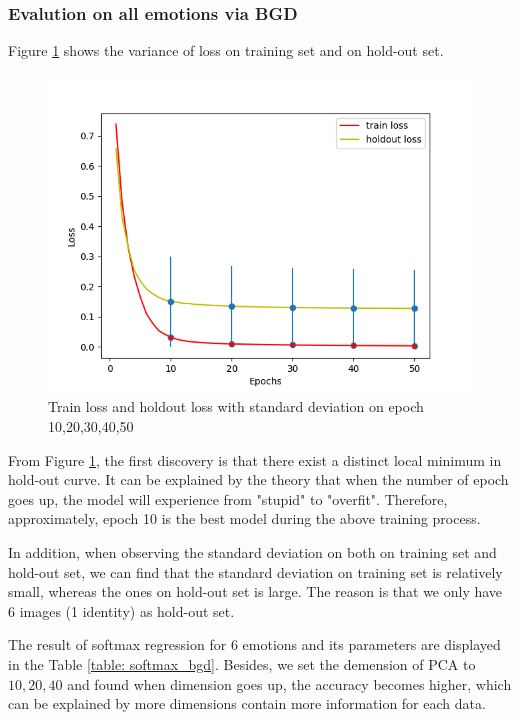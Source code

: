 \documentclass{article}
\begin{document}
\subsubsection{Evalution on all emotions via BGD}
Figure \ref{figure: loss_bgd} shows the variance of loss on training set and on hold-out set.
\begin{figure}[ht]
\begin{center}
\includegraphics[scale=0.5]{images/softmax_bgd.png}
\end{center}
\caption{Train loss and holdout loss with standard deviation on epoch 10,20,30,40,50}
\label{figure: loss_bgd}
\end{figure}
From Figure \ref{figure: loss_bgd}, the first discovery is that there exist a distinct local minimum in hold-out curve. It can be explained by the theory that when the number of epoch goes up, the model will experience from "stupid" to "overfit". Therefore, approximately, epoch 10 is the best model during the above training process.
\par
In addition, when observing the standard deviation on both on training set and hold-out set, we can find that the standard deviation on training set is relatively small, whereas the ones on hold-out set is large. The reason is that we only have 6 images (1 identity) as hold-out set.
\par
 The result of softmax regression for 6 emotions and its parameters are displayed in the Table \ref{table: softmax_bgd}. Besides, we set the demension of PCA to $10,20,40$ and found when dimension goes up, the accuracy becomes higher, which can be explained by more dimensions contain more information for each data.
\end{document}
